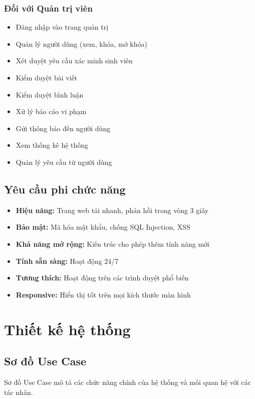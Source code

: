 \documentclass[12pt,a4paper]{report}
\begin{document}
\subsubsection{Đối với Quản trị viên}
\begin{itemize}
    \item Đăng nhập vào trang quản trị
    \item Quản lý người dùng (xem, khóa, mở khóa)
    \item Xét duyệt yêu cầu xác minh sinh viên
    \item Kiểm duyệt bài viết
    \item Kiểm duyệt bình luận
    \item Xử lý báo cáo vi phạm
    \item Gửi thông báo đến người dùng
    \item Xem thống kê hệ thống
    \item Quản lý yêu cầu từ người dùng
\end{itemize}

\subsection{Yêu cầu phi chức năng}

\begin{itemize}
    \item \textbf{Hiệu năng:} Trang web tải nhanh, phản hồi trong vòng 3 giây
    \item \textbf{Bảo mật:} Mã hóa mật khẩu, chống SQL Injection, XSS
    \item \textbf{Khả năng mở rộng:} Kiến trúc cho phép thêm tính năng mới
    \item \textbf{Tính sẵn sàng:} Hoạt động 24/7
    \item \textbf{Tương thích:} Hoạt động trên các trình duyệt phổ biến
    \item \textbf{Responsive:} Hiển thị tốt trên mọi kích thước màn hình
\end{itemize}

\section{Thiết kế hệ thống}

\subsection{Sơ đồ Use Case}

Sơ đồ Use Case mô tả các chức năng chính của hệ thống và mối quan hệ với các tác nhân.
\end{document}
